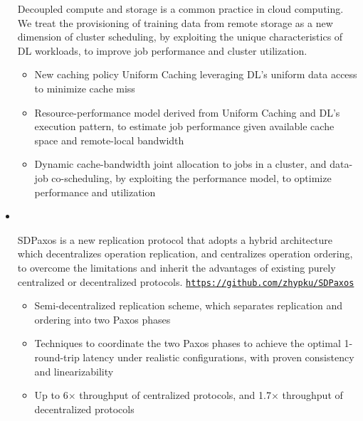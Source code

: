 \begin{itemize}[leftmargin=*]
{          Decoupled compute and storage is a common practice in cloud computing.
          We treat the provisioning of training data from remote storage as a new dimension of cluster scheduling, by exploiting the unique characteristics of DL workloads, to improve job performance and cluster utilization.
          \vspace{-5pt}
          \begin{itemize}[leftmargin=*]
            \item New caching policy Uniform Caching leveraging DL's uniform data access to minimize cache miss
            \item Resource-performance model derived from Uniform Caching and DL's execution pattern, to estimate job performance given available cache space and remote-local bandwidth
            \item Dynamic cache-bandwidth joint allocation to jobs in a cluster, and data-job co-scheduling, by exploiting the performance model, to optimize performance and utilization
          \end{itemize}
      }
    \item
      \vspace{-10pt}\\
      {

          SDPaxos is a new replication protocol that adopts a hybrid architecture which decentralizes operation replication, and centralizes operation ordering, to overcome the limitations and inherit the advantages of existing purely centralized or decentralized protocols. \texttt{\url{https://github.com/zhypku/SDPaxos}}

          \vspace{-5pt}
          \begin{itemize}[leftmargin=*]
            \item Semi-decentralized replication scheme, which separates replication and ordering into two Paxos phases
            \item Techniques to coordinate the two Paxos phases to achieve the optimal 1-round-trip latency under realistic configurations, with proven consistency and linearizability
            \item Up to 6$\times$ throughput of centralized protocols, and 1.7$\times$ throughput of decentralized protocols
          \end{itemize}
      }
  \end{itemize}